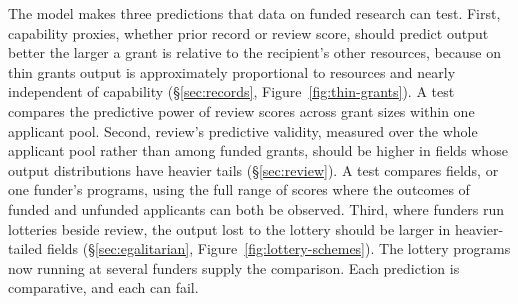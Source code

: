 \documentclass[article, 11pt, reqno]{amsart}
\theoremstyle{named}
\begin{document}
The model makes three predictions that data on funded research can test. First,
capability proxies, whether prior record or review score, should predict output
better the larger a grant is relative to the recipient's other resources, because on
thin grants output is approximately proportional to resources and nearly independent
of capability (\S\ref{sec:records}, Figure~\ref{fig:thin-grants}). A test compares
the predictive power of review scores across grant sizes within one applicant pool.
Second, review's predictive validity, measured over the whole applicant pool rather
than among funded grants, should be higher in fields whose output distributions have
heavier tails (\S\ref{sec:review}). A test compares fields, or one funder's programs,
using the full range of scores where the outcomes of funded and unfunded applicants
can both be observed. Third, where funders run lotteries beside review, the output
lost to the lottery should be larger in heavier-tailed fields
(\S\ref{sec:egalitarian}, Figure~\ref{fig:lottery-schemes}). The lottery programs now
running at several funders supply the comparison. Each prediction is comparative, and
each can fail.

\begin{appendices}



\end{appendices}



\end{document}
